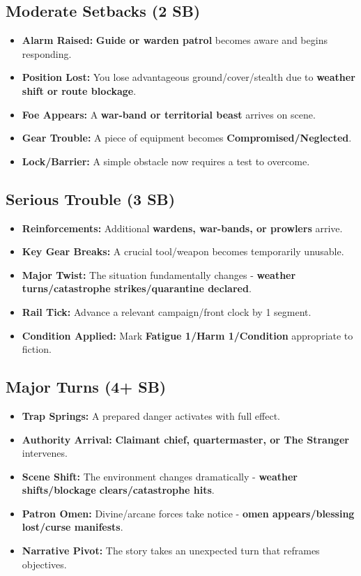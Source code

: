 \subsection*{Moderate Setbacks (2 SB)}
\begin{itemize}
\item \textbf{Alarm Raised:} \textbf{Guide or warden patrol} becomes aware and begins responding.
\item \textbf{Position Lost:} You lose advantageous ground/cover/stealth due to \textbf{weather shift or route blockage}.
\item \textbf{Foe Appears:} A \textbf{war-band or territorial beast} arrives on scene.
\item \textbf{Gear Trouble:} A piece of equipment becomes \textbf{Compromised/Neglected}.
\item \textbf{Lock/Barrier:} A simple obstacle now requires a test to overcome.
\end{itemize}

\subsection*{Serious Trouble (3 SB)}
\begin{itemize}
\item \textbf{Reinforcements:} Additional \textbf{wardens, war-bands, or prowlers} arrive.
\item \textbf{Key Gear Breaks:} A crucial tool/weapon becomes temporarily unusable.
\item \textbf{Major Twist:} The situation fundamentally changes - \textbf{weather turns/catastrophe strikes/quarantine declared}.
\item \textbf{Rail Tick:} Advance a relevant campaign/front clock by 1 segment.
\item \textbf{Condition Applied:} Mark \textbf{Fatigue 1/Harm 1/Condition} appropriate to fiction.
\end{itemize}

\subsection*{Major Turns (4+ SB)}
\begin{itemize}
\item \textbf{Trap Springs:} A prepared danger activates with full effect.
\item \textbf{Authority Arrival:} \textbf{Claimant chief, quartermaster, or The Stranger} intervenes.
\item \textbf{Scene Shift:} The environment changes dramatically - \textbf{weather shifts/blockage clears/catastrophe hits}.
\item \textbf{Patron Omen:} Divine/arcane forces take notice - \textbf{omen appears/blessing lost/curse manifests}.
\item \textbf{Narrative Pivot:} The story takes an unexpected turn that reframes objectives.
\end{itemize}

